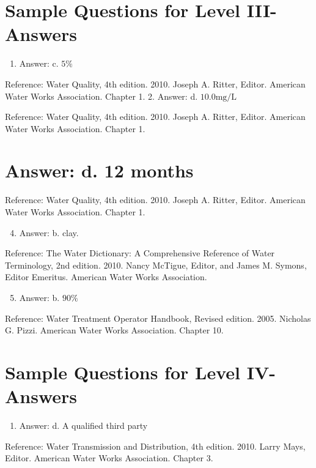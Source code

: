 \documentclass[10pt]{article}
\begin{document}
\section{Sample Questions for Level III-Answers}
\begin{enumerate}
  \item Answer: c. $5 \%$
\end{enumerate}

Reference: Water Quality, 4th edition. 2010. Joseph A. Ritter, Editor. American Water Works Association. Chapter 1. 2. Answer: d. $10.0 \mathrm{mg} / \mathrm{L}$

Reference: Water Quality, 4th edition. 2010. Joseph A. Ritter, Editor. American Water Works Association. Chapter 1.

\section{Answer: d. 12 months}
Reference: Water Quality, 4th edition. 2010. Joseph A. Ritter, Editor. American Water Works Association. Chapter 1.

\begin{enumerate}
  \setcounter{enumi}{3}
  \item Answer: b. clay.
\end{enumerate}

Reference: The Water Dictionary: A Comprehensive Reference of Water Terminology, 2nd edition. 2010. Nancy McTigue, Editor, and James M. Symons, Editor Emeritus. American Water Works Association.

\begin{enumerate}
  \setcounter{enumi}{4}
  \item Answer: b. $90 \%$
\end{enumerate}

Reference: Water Treatment Operator Handbook, Revised edition. 2005. Nicholas G. Pizzi. American Water Works Association. Chapter 10.

\section{Sample Questions for Level IV-Answers}
\begin{enumerate}
  \item Answer: d. A qualified third party
\end{enumerate}

Reference: Water Transmission and Distribution, 4th edition. 2010. Larry Mays, Editor. American Water Works Association. Chapter 3.
\end{document}
